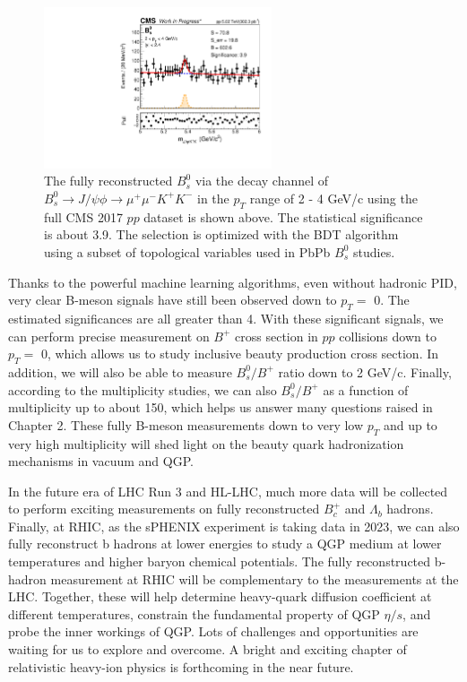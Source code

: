  \begin{figure}[hbtp]
\begin{center}
\includegraphics[width=0.60\textwidth]{Figures/Chapter6/BsLow.pdf}
\caption{The fully reconstructed $B^0_s$ via the decay channel of $B^0_s\rightarrow J/\psi \phi  \rightarrow \mu^+\mu^- K^+ K^-$ in the $p_T$ range of 2 - 4 GeV/c using the full CMS 2017 $pp$ dataset is shown above. The statistical significance is about 3.9. The selection is optimized with the BDT algorithm using a subset of topological variables used in PbPb $B^0_s$ studies.}
\label{BsLow}
\end{center}
\end{figure}   

Thanks to the powerful machine learning algorithms, even without hadronic PID, very clear B-meson signals have still been observed down to $p_T =$ 0. The estimated significances are all greater than 4. With these significant signals, we can perform precise measurement on $B^+$ cross section in $pp$ collisions down to $p_T =$ 0, which allows us to study inclusive beauty production cross section. In addition, we will also be able to measure $B^0_s/B^+$ ratio down to 2 GeV/c. Finally, according to the multiplicity studies, we can also $B^0_s/B^+$ as a function of multiplicity up to about 150, which helps us answer many questions raised in Chapter 2.  These fully B-meson measurements down to very low $p_T$ and up to very high multiplicity will shed light on the beauty quark hadronization mechanisms in vacuum and QGP.

In the future era of LHC Run 3 and HL-LHC, much more data will be collected to perform exciting measurements on fully reconstructed $B^+_c$ and $\Lambda_b$ hadrons. Finally, at RHIC, as the sPHENIX experiment is taking data in 2023, we can also fully reconstruct b hadrons at lower energies to study a QGP medium at lower temperatures and higher baryon chemical potentials. The fully reconstructed b-hadron measurement at RHIC will be complementary to the measurements at the LHC. Together, these will help determine heavy-quark diffusion coefficient at different temperatures, constrain the fundamental property of QGP $\eta/s$, and probe the inner workings of QGP. Lots of challenges and opportunities are waiting for us to explore and overcome. A bright and exciting chapter of relativistic heavy-ion physics is forthcoming in the near future.



